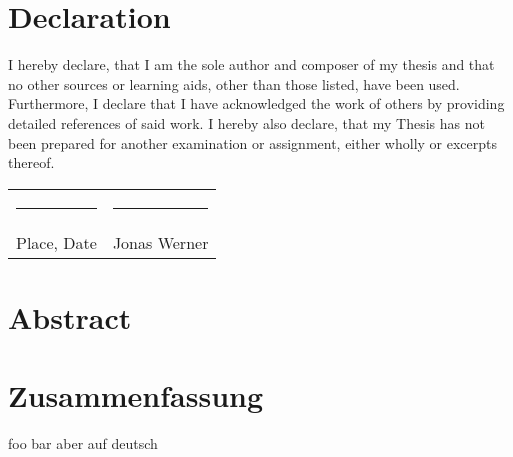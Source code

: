 \documentclass[11pt, a4paper, BCOR=10mm, ngerman]{scrbook}
\begin{document}
\pagebreak

\chapter*{Declaration}

I hereby declare, that I am the sole author and composer of my thesis and that no other sources or learning aids, other than those listed, have been used. Furthermore, I declare that I have acknowledged the work of others by providing detailed references of said work.  \newline
I hereby also declare, that my Thesis has not been prepared for another examination
or assignment, either wholly or excerpts thereof.
\\[3\normalbaselineskip]
\begin{tabular}{p{} l}
  \rule{0.33\textwidth}{0.4pt}   &   \rule{0.33\textwidth}{0.4pt} \\
  Place, Date                  &   Jonas Werner
\end{tabular}

\chapter*{Abstract}


\chapter*{Zusammenfassung}
foo bar aber auf deutsch



\tableofcontents


\mainmatter
\end{document}
